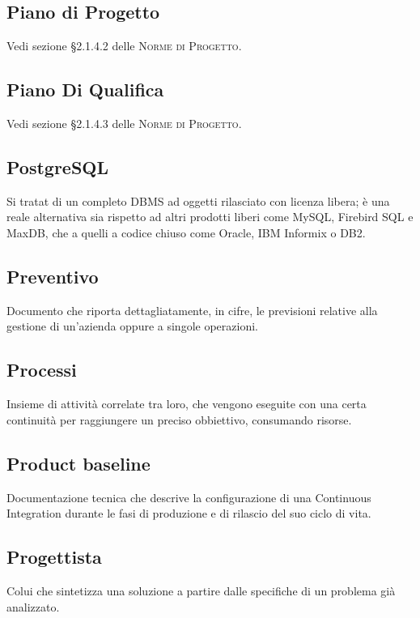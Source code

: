 \documentclass[../glossario.tex]{subfiles}
\begin{document}
\subsection*{Piano di Progetto}
{}
Vedi sezione \S2.1.4.2 delle \textsc{Norme di Progetto}.

\subsection*{Piano Di Qualifica}
{}
Vedi sezione \S2.1.4.3 delle \textsc{Norme di Progetto}.

\subsection*{PostgreSQL}
{}
Si tratat di un completo DBMS ad oggetti rilasciato con licenza libera; è una reale alternativa sia rispetto ad altri prodotti liberi come MySQL, Firebird SQL e MaxDB, che a quelli a codice chiuso come Oracle, IBM Informix o DB2.

\subsection*{Preventivo}
{}
Documento che riporta dettagliatamente, in cifre, le previsioni relative alla gestione di un'azienda oppure a singole operazioni.

\subsection*{Processi}
{}
Insieme di attività correlate tra loro, che vengono eseguite con una certa continuità per raggiungere un preciso obbiettivo, consumando risorse.

\subsection*{Product baseline}
{}
Documentazione tecnica che descrive la configurazione di una Continuous Integration durante le fasi di produzione e di rilascio del suo ciclo di vita.

\subsection*{Progettista}
{}
Colui che sintetizza una soluzione a partire dalle specifiche di un problema già analizzato.
\end{document}
